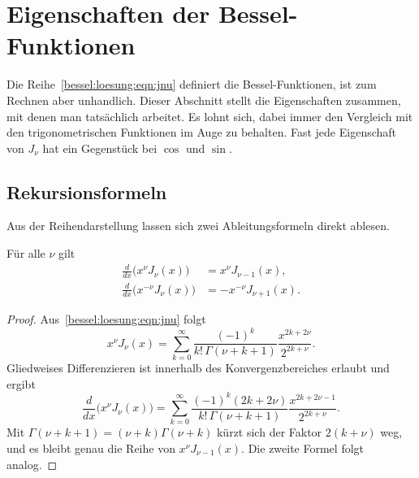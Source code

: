 %
%
%
%
\section{Eigenschaften der Bessel-Funktionen
\label{bessel:section:eigenschaften}}
%
%
Die Reihe~\eqref{bessel:loesung:eqn:jnu} definiert die Bessel-Funktionen, ist zum Rechnen aber unhandlich.
Dieser Abschnitt stellt die Eigenschaften zusammen, mit denen man tatsächlich arbeitet.
Es lohnt sich, dabei immer den Vergleich mit den trigonometrischen Funktionen im Auge zu behalten.
Fast jede Eigenschaft von $J_\nu$ hat ein Gegenstück bei $\cos$ und $\sin$.

%
%
\subsection{Rekursionsformeln
\label{bessel:eigenschaften:subsection:rekursion}}
Aus der Reihendarstellung lassen sich zwei Ableitungsformeln direkt ablesen.

\begin{satz}
\label{bessel:eigenschaften:satz:ableitung}
Für alle $\nu$ gilt
\begin{align}
\frac{d}{dx}
\bigl( x^{\nu} J_\nu(x) \bigr)
&=
x^{\nu} J_{\nu-1}(x),
\label{bessel:eigenschaften:eqn:ableitung1}
\\
\frac{d}{dx}
\bigl( x^{-\nu} J_\nu(x) \bigr)
&=
-x^{-\nu} J_{\nu+1}(x).
\label{bessel:eigenschaften:eqn:ableitung2}
\end{align}
\end{satz}
 
\begin{proof}
Aus~\eqref{bessel:loesung:eqn:jnu} folgt
\[
x^\nu J_\nu(x)
=
\sum_{k=0}^\infty
\frac{(-1)^k}{k!\,\Gamma(\nu+k+1)}
\frac{x^{2k+2\nu}}{2^{2k+\nu}}.
\]
Gliedweises Differenzieren ist innerhalb des Konvergenzbereiches erlaubt und ergibt
\[
\frac{d}{dx}
\bigl( x^\nu J_\nu(x) \bigr)
=
\sum_{k=0}^\infty
\frac{(-1)^k (2k+2\nu)}{k!\,\Gamma(\nu+k+1)}
\frac{x^{2k+2\nu-1}}{2^{2k+\nu}}.
\]
Mit $\Gamma(\nu+k+1)=(\nu+k)\Gamma(\nu+k)$ kürzt sich der Faktor $2(k+\nu)$ weg, und es bleibt genau die Reihe von $x^\nu J_{\nu-1}(x)$.
Die zweite Formel folgt analog.
\end{proof}
 
